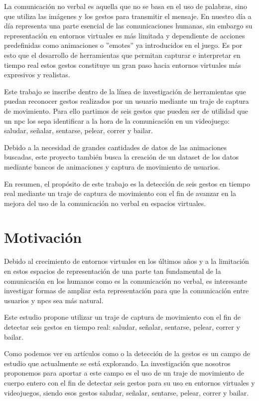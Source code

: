 La comunicación no verbal es aquella que no se basa en el uso de palabras, sino que utiliza las imágenes y los gestos para transmitir el mensaje.
En nuestro día a día representa una parte esencial de las comunicaciones humanas, sin embargo su representación en entornos virtuales es más limitada y dependiente de acciones predefinidas como animaciones o ''emotes'' ya introducidos en el juego.
Es por esto que el desarrollo de herramientas que permitan capturar e interpretar en tiempo real estos gestos constituye un gran paso hacia entornos virtuales más expresivos y realistas.

Este trabajo se inscribe dentro de la línea de investigación de herramientas que puedan reconocer gestos realizados por un usuario mediante un traje de captura de movimiento.
Para ello partimos de seis gestos que pueden ser de utilidad que un \gls{npc} los sepa identificar a la hora de la comunicación en un videojuego: saludar, señalar, sentarse, pelear, correr y bailar.

Debido a la necesidad de grandes cantidades de datos de las animaciones buscadas, este proyecto también busca la creación de un dataset de los datos mediante bancos de animaciones y captura de movimiento de usuarios.

En resumen, el propósito de este trabajo es la detección de seis gestos en tiempo real mediante un traje de captura de movimiento con el fin de avanzar en la mejora del uso de la comunicación no verbal en espacios virtuales.

\section{Motivación}
Debido al crecimiento de entornos virtuales en los últimos años y a la limitación en estos espacios de representación de una parte tan fundamental de la comunicación en los humanos como es la comunicación no verbal, es interesante investigar formas de ampliar esta representación para que la comunicación entre usuarios y \glspl{npc} sea más natural.

Este estudio propone utilizar un traje de captura de movimiento con el fin de detectar seis gestos en tiempo real: saludar, señalar, sentarse, pelear, correr y bailar.

Como podemos ver en artículos como \cite{Neverova} o \cite{VRHANDS} la detección de la gestos es un campo de estudio que actualmente se está explorando.
La investigación que nosotros proponemos para aportar a este campo es el uso de un traje de movimiento de cuerpo entero con el fin de detectar seis gestos para su uso en entornos virtuales y videojuegos, siendo esos gestos saludar, señalar, sentarse, pelear, correr y bailar.

